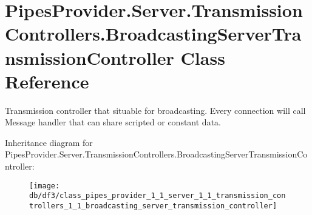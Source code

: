 \hypertarget{class_pipes_provider_1_1_server_1_1_transmission_controllers_1_1_broadcasting_server_transmission_controller}{}\section{Pipes\+Provider.\+Server.\+Transmission\+Controllers.\+Broadcasting\+Server\+Transmission\+Controller Class Reference}
\label{class_pipes_provider_1_1_server_1_1_transmission_controllers_1_1_broadcasting_server_transmission_controller}


Transmission controller that situable for broadcasting. Every connection will call Message handler that can share scripted or constant data.  


Inheritance diagram for Pipes\+Provider.\+Server.\+Transmission\+Controllers.\+Broadcasting\+Server\+Transmission\+Controller\+:\begin{figure}[H]
\begin{center}
\leavevmode
\texttt{[image: db/df3/class\_pipes\_provider\_1\_1\_server\_1\_1\_transmission\_controllers\_1\_1\_broadcasting\_server\_transmission\_controller]}
\end{center}
\end{figure}
